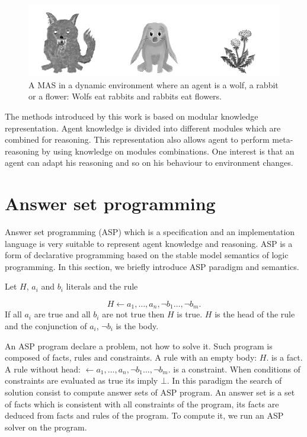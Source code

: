 \documentclass{aamas2012}
\begin{document}
	\begin{figure}
		\centering
		\includegraphics[keepaspectratio=true,scale=3.0]{food_chain.png}
		\caption
		{
			\label{food_chain}
			A MAS in a dynamic environment where an agent is a wolf, a rabbit or a flower:
			Wolfs eat rabbits and rabbits eat flowers.
		}
	\end{figure}
	
	The methods introduced by this work is based on modular knowledge representation.
	Agent knowledge is divided into different modules which are combined for reasoning.
	This representation also allows agent to perform meta-reasoning by using knowledge on modules combinations.
	One interest is that an agent can adapt his reasoning and so on his behaviour to environment changes.

\section{Answer set programming}

	Answer set programming (ASP) which is a specification and an implementation language is very suitable to represent agent knowledge and reasoning.
	ASP is a form of declarative programming based on the stable model semantics of logic programming.
	In this section, we briefly introduce ASP paradigm and semantics.

	\begin{definition}[Rule]
		Let $H$, $a_{i}$ and $b_{i}$ literals and the rule
	
					$$H \leftarrow a_{1}, \ldots , a_{n}, \neg b_{1} \ldots, \neg b_{m}.$$
		If all $a_{i}$ are true and all $b_{i}$ are not true then $H$ is true.
		$H$ is the head of the rule and the conjunction of $a_{i}$, $\neg b_{i}$ is the body.
	\end{definition}

	An ASP program declare a problem, not how to solve it.
	Such program is composed of facts, rules and constraints. 
	A rule with an empty body: $H.$ is a fact.
	A rule without head: $\leftarrow a_{1}, \ldots , a_{n}, \neg b_{1} \ldots, \neg b_{m}.$ is a constraint.
	When conditions of constraints are evaluated as true its imply $\bot$.
	In this paradigm the search of solution consist to compute answer sets of ASP program.
	An answer set is a set of facts which is consistent with all constraints of the program, its facts are deduced from facts and rules of the program.
	To compute it, we run an ASP solver on the program.
	
\end{document}
